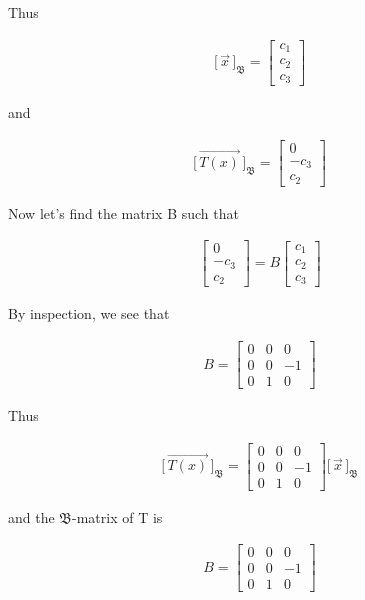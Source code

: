 \documentclass{article}
\newcommand{\Coord}[2]{\Bigg[ \, \vec{#1} \, \Bigg]_{\mathfrak{#2}}}
\begin{document}
Thus 

\begin{align*}
\Coord{x}{B} = \begin{bmatrix} c_{1} \\ c_{2} \\ c_{3} \end{bmatrix}
\end{align*} 

and 

\begin{align*}
\Coord{T(x)}{B} = \begin{bmatrix} 0 \\ -c_{3} \\ c_{2} \end{bmatrix}
\end{align*} 

Now let's find the matrix B such that 

\begin{align*}
\begin{bmatrix} 0 \\ -c_{3} \\ c_{2} \end{bmatrix} = B \begin{bmatrix} c_{1} \\ c_{2} \\ c_{3} \end{bmatrix}
\end{align*}

By inspection, we see that

\begin{align*}
B = \begin{bmatrix} 0 & 0 & 0 \\ 0 & 0 & -1 \\ 0 & 1 & 0 \end{bmatrix}
\end{align*}

Thus 

\begin{align*}
\Coord{T(x)}{B} = \begin{bmatrix} 0 & 0 & 0 \\ 0 & 0 & -1 \\ 0 & 1 & 0 \end{bmatrix} \Coord{x}{B}
\end{align*}

and the $\mathfrak{B}$-matrix of T is

\begin{align*}
B = \begin{bmatrix} 0 & 0 & 0 \\ 0 & 0 & -1 \\ 0 & 1 & 0 \end{bmatrix}
\end{align*}
\end{document}
